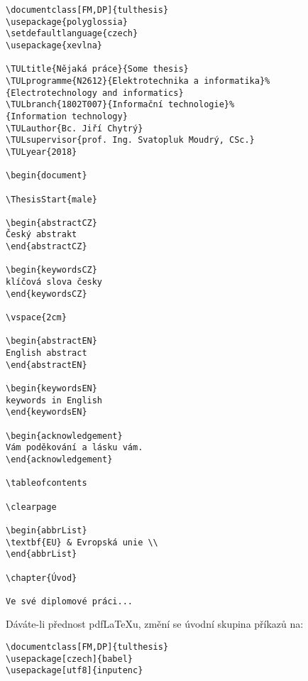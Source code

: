 \documentclass[FM,DP,EN]{tulthesis}
\newenvironment{myquote}{\begin{list}{}{\setlength\leftmargin\parindent}\item[]}{\end{list}}
\newenvironment{listing}{\begin{myquote}\color{\tulcolor}}{\end{myquote}}
\begin{document}
\begin{listing}
\begin{verbatim}
\documentclass[FM,DP]{tulthesis}
\usepackage{polyglossia}
\setdefaultlanguage{czech}
\usepackage{xevlna}

\TULtitle{Nějaká práce}{Some thesis}
\TULprogramme{N2612}{Elektrotechnika a informatika}%
{Electrotechnology and informatics}
\TULbranch{1802T007}{Informační technologie}%
{Information technology}
\TULauthor{Bc. Jiří Chytrý}
\TULsupervisor{prof. Ing. Svatopluk Moudrý, CSc.}
\TULyear{2018}

\begin{document}

\ThesisStart{male}

\begin{abstractCZ}
Český abstrakt
\end{abstractCZ}

\begin{keywordsCZ}
klíčová slova česky
\end{keywordsCZ}

\vspace{2cm}

\begin{abstractEN}
English abstract
\end{abstractEN}

\begin{keywordsEN}
keywords in English
\end{keywordsEN}

\begin{acknowledgement}
Vám poděkování a lásku vám.
\end{acknowledgement}

\tableofcontents

\clearpage

\begin{abbrList}
\textbf{EU} & Evropská unie \\
\end{abbrList}

\chapter{Úvod}

Ve své diplomové práci...
\end{verbatim}
\end{listing}

Dáváte-li přednost pdf\LaTeX u, změní se úvodní skupina příkazů na:

\begin{listing}
\begin{verbatim}
\documentclass[FM,DP]{tulthesis}
\usepackage[czech]{babel}
\usepackage[utf8]{inputenc}
\end{verbatim}
\end{listing}
\end{document}
